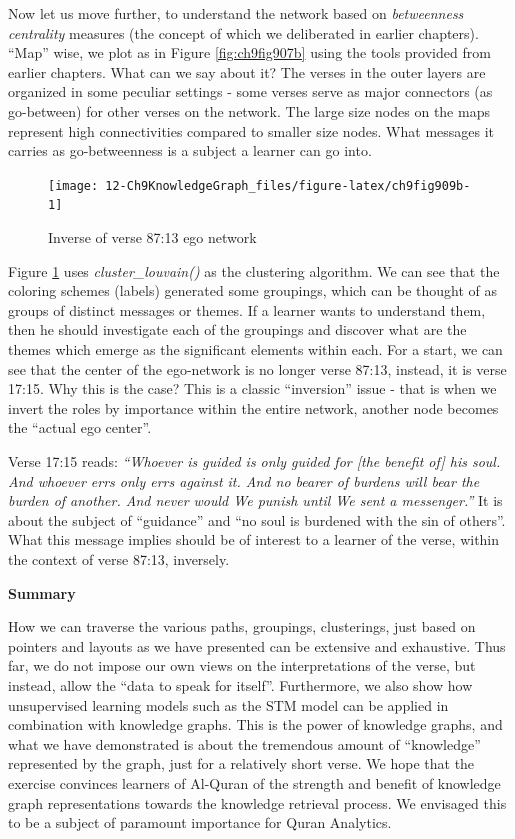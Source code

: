 \documentclass[
]{article}
\begin{document}
Now let us move further, to understand the network based on \emph{betweenness centrality} measures (the concept of which we deliberated in earlier chapters). ``Map'' wise, we plot as in Figure \ref{fig:ch9fig907b} using the tools provided from earlier chapters. What can we say about it? The verses in the outer layers are organized in some peculiar settings - some verses serve as major connectors (as go-between) for other verses on the network. The large size nodes on the maps represent high connectivities compared to smaller size nodes. What messages it carries as go-betweenness is a subject a learner can go into.

\begin{figure}

{\centering \texttt{[image: 12-Ch9KnowledgeGraph\_files/figure-latex/ch9fig909b-1]} 

}

\caption{Inverse of verse 87:13 ego network}\label{fig:ch9fig909b}
\end{figure}

Figure \ref{fig:ch9fig909b} uses \emph{cluster\_louvain()} as the clustering algorithm. We can see that the coloring schemes (labels) generated some groupings, which can be thought of as groups of distinct messages or themes. If a learner wants to understand them, then he should investigate each of the groupings and discover what are the themes which emerge as the significant elements within each. For a start, we can see that the center of the ego-network is no longer verse 87:13, instead, it is verse 17:15. Why this is the case? This is a classic ``inversion'' issue - that is when we invert the roles by importance within the entire network, another node becomes the ``actual ego center''.

Verse 17:15 reads: \emph{``Whoever is guided is only guided for {[}the benefit of{]} his soul. And whoever errs only errs against it. And no bearer of burdens will bear the burden of another. And never would We punish until We sent a messenger.''} It is about the subject of ``guidance'' and ``no soul is burdened with the sin of others''. What this message implies should be of interest to a learner of the verse, within the context of verse 87:13, inversely.

\textbf{Summary}

How we can traverse the various paths, groupings, clusterings, just based on pointers and layouts as we have presented can be extensive and exhaustive. Thus far, we do not impose our own views on the interpretations of the verse, but instead, allow the ``data to speak for itself''. Furthermore, we also show how unsupervised learning models such as the STM model can be applied in combination with knowledge graphs. This is the power of knowledge graphs, and what we have demonstrated is about the tremendous amount of ``knowledge'' represented by the graph, just for a relatively short verse. We hope that the exercise convinces learners of Al-Quran of the strength and benefit of knowledge graph representations towards the knowledge retrieval process. We envisaged this to be a subject of paramount importance for Quran Analytics.
\end{document}
